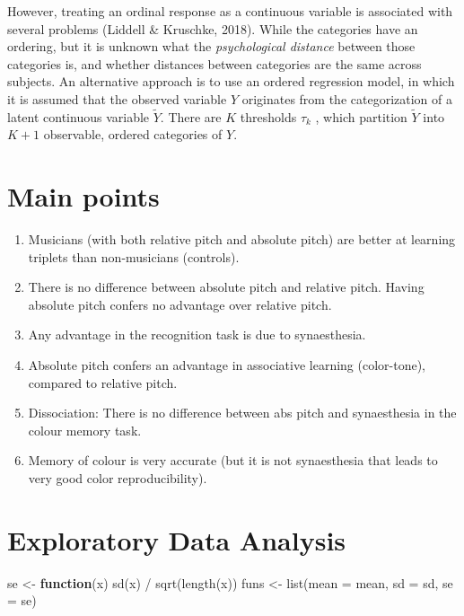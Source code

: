\documentclass[
  man,floatsintext]{apa7}
\newenvironment{Shaded}{\begin{snugshade}}{\end{snugshade}}
\newcommand{\AttributeTok}[1]{\textcolor[rgb]{0.77,0.63,0.00}{#1}}
\newcommand{\ControlFlowTok}[1]{\textcolor[rgb]{0.13,0.29,0.53}{\textbf{#1}}}
\newcommand{\FunctionTok}[1]{\textcolor[rgb]{0.00,0.00,0.00}{#1}}
\newcommand{\NormalTok}[1]{#1}
\newcommand{\OtherTok}[1]{\textcolor[rgb]{0.56,0.35,0.01}{#1}}
\newcommand{\SpecialCharTok}[1]{\textcolor[rgb]{0.00,0.00,0.00}{#1}}
\begin{document}
However, treating an ordinal response as a continuous variable is associated with several problems (Liddell \& Kruschke, 2018). While the categories have an ordering, but it is unknown what the \emph{psychological distance} between those categories is, and whether distances between categories are the same across subjects. An alternative approach is to use an ordered regression model, in which it is assumed that the observed variable \(Y\) originates from the categorization of a latent continuous variable \(\tilde{Y}\). There are \(K\) thresholds \(\tau_k\) , which partition \(\tilde{Y}\) into \(K+1\) observable, ordered categories of \(Y\).

\hypertarget{main-points}{%
\section{Main points}\label{main-points}}

\begin{enumerate}
\def\labelenumi{\arabic{enumi})}
\item
  Musicians (with both relative pitch and absolute pitch) are better at
  learning triplets than non-musicians (controls).
\item
  There is no difference between absolute pitch and relative pitch. Having
  absolute pitch confers no advantage over relative pitch.
\item
  Any advantage in the recognition task is due to synaesthesia.
\item
  Absolute pitch confers an advantage in associative learning (color-tone),
  compared to relative pitch.
\item
  Dissociation: There is no difference between abs pitch and synaesthesia in the colour memory task.
\item
  Memory of colour is very accurate (but it is not synaesthesia that
  leads to very good color reproducibility).
\end{enumerate}

\hypertarget{exploratory-data-analysis}{%
\section{Exploratory Data Analysis}\label{exploratory-data-analysis}}

\begin{Shaded}
\begin{Highlighting}[]
\NormalTok{se }\OtherTok{\textless{}{-}} \ControlFlowTok{function}\NormalTok{(x) }\FunctionTok{sd}\NormalTok{(x) }\SpecialCharTok{/} \FunctionTok{sqrt}\NormalTok{(}\FunctionTok{length}\NormalTok{(x))}
\NormalTok{funs }\OtherTok{\textless{}{-}} \FunctionTok{list}\NormalTok{(}\AttributeTok{mean =}\NormalTok{ mean, }\AttributeTok{sd =}\NormalTok{ sd, }\AttributeTok{se =}\NormalTok{ se)}
\end{Highlighting}
\end{Shaded}
\end{document}
